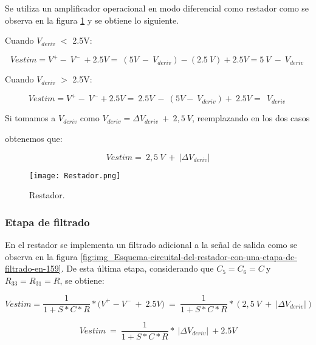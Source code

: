 \noindent Se utiliza un amplificador operacional en modo diferencial como restador como se observa en la figura \ref{fig:img_Restador} y se obtiene lo siguiente.

\noindent Cuando $V_{deriv}$ $\mathrm{<}$ 2.5V:

\begin{equation} \label{eq_rest_1}
	Vestim=V^+-\ V^-\ +2.5V=\ (5V\ -\ V_{deriv})-(2.5\ V)+2.5V=5\ V\ -\ V_{deriv}\  
\end{equation}

\noindent Cuando $V_{deriv}$ $\mathrm{>}$ 2.5V: 

\begin{equation} \label{eq_rest_2}
	{Vestim=V}^+-\ V^-+2.5V=\ 2.5V\ -\ (5V-\ V_{deriv})+\ 2.5V=\ \ V_{deriv}\ 
\end{equation}

\noindent Si tomamos a $V_{deriv}$ como $V_{deriv}=\mathit{\Delta}V_{deriv}\ +\ 2,5\ V$, reemplazando en los dos casos

\noindent obtenemos que:

\begin{equation} \label{eq_rest_3}
	Vestim=\ 2,5\ V\ +\ |\mathit{\Delta}V_{deriv}|
\end{equation}

\begin{figure}[H]
	\centering
	\texttt{[image: Restador.png]}
	\caption{Restador.}
	\label{fig:img_Restador}
\end{figure}

\subsubsection{Etapa de filtrado}

\noindent En el restador se implementa un filtrado adicional a la se\~{n}al de salida como se observa en la figura  \ref{fig:img_Esquema-circuital-del-restador-con-una-etapa-de-filtrado-en-159}. De esta \'{u}ltima etapa, considerando que $C_5=C_6=C\ $y $R_{33}=R_{31}=R$, se obtiene:

\begin{equation} \label{eq_Vestim_1}
	{Vestim}=\frac{1}{1+S*C*R}*{(V}^+-V^-\ +\ 2.5V)\ =\ \frac{1}{1+S*C*R}*(2,5\ V\ +\ |\mathit{\Delta}V_{deriv}|)
\end{equation}

\begin{equation} \label{eq_Vestim_2}
	Vestim\ =\ \frac{1}{1+S*C*R}*\ |\mathit{\Delta}V_{deriv}|\ +2.5V
\end{equation}



